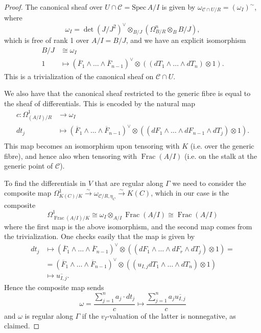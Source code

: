 \documentclass{article}
\theoremstyle{definition}
\theoremstyle{plain}
\theoremstyle{remark}
\newcommand{\spec}{\mathrm{Spec}\,}
\DeclareMathOperator{\Frac}{\mathrm{Frac}}
\begin{document}
	\begin{proof}
		The canonical sheaf over $U\cap \mathcal{C} = \spec A/I$ is given by $\omega_{\mathcal{C}\cap U/R} = (\omega_I)^\sim$, where 
		\[\omega_I = \det(J/J^2)^\vee \otimes_{B/J} (\Omega^n_{B/R}\otimes_B B/J),\]
		which is free of rank 1 over $A/I = B/J$, and we have an explicit isomorphism
		\begin{align*}
			B/J &\cong \omega_I\\
			1 &\mapsto (\overline{F}_1\wedge \ldots \wedge \overline{F}_{n-1})^\vee
			\otimes ((dT_1\wedge \ldots\wedge dT_n)\otimes 1).
		\end{align*}
		This is a trivialization of the canonical sheaf on $\mathcal{C}\cap U$.
		
		We also have that the canonical sheaf restricted to the generic fibre is equal to the sheaf of differentials. This is encoded by the natural map
		\begin{align*}
			c:\Omega^1_{(A/I)/R} &\to \omega_I\\
			dt_j &\mapsto (\overline{F}_1\wedge \ldots \wedge \overline{F}_{n-1})^\vee \otimes ((dF_1\wedge \ldots \wedge dF_{n-1}\wedge dT_j) \otimes 1).\\
		\end{align*}
		This map becomes an isomorphism upon tensoring with $K$ (i.e. over the generic fibre), and hence also when tensoring with $\Frac(A/I)$ (i.e. on the stalk at the generic point of $\mathcal{C}$).
		
		To find the differentials in $V$ that are regular along $\Gamma$ we need to consider the composite map $\Omega^1_{K(C)/K}\xrightarrow{\sim} \omega_{\mathcal{C}/R, \eta_C} \xrightarrow{\sim} K(C)$, which in our case is the composite
		\[\Omega^1_{\Frac(A/I)/K}\cong \omega_I \otimes_{A/I} \Frac(A/I) \cong \Frac(A/I)\]
		where the first map is the above isomorphism, and the second map comes from the trivialization. One checks easily that the map is given by
		\begin{align*}
			dt_j&\mapsto(\overline{F}_1\wedge \ldots \wedge \overline{F}_{n-1})^\vee \otimes ((dF_1\wedge \ldots \wedge dF_r\wedge dT_j) \otimes 1) =\\
			&= (\overline{F}_1\wedge \ldots \wedge \overline{F}_{n-1})^\vee \otimes ((u_{I,j}dT_1\wedge\ldots\wedge dT_n)\otimes 1)\\
			&\mapsto \overline{u_{I,j}}.
		\end{align*}
		Hence the composite map sends 
		\[\omega = \frac{\sum_{j=1}^n a_j \cdot dt_j}{c}\mapsto \frac{\sum_{j=1}^n a_j\overline{u_{I, j}}}{c}\]
		and $\omega$ is regular along $\Gamma$ if the $v_I$-valuation of the latter is nonnegative, as claimed.
	\end{proof}
	
\end{document}

